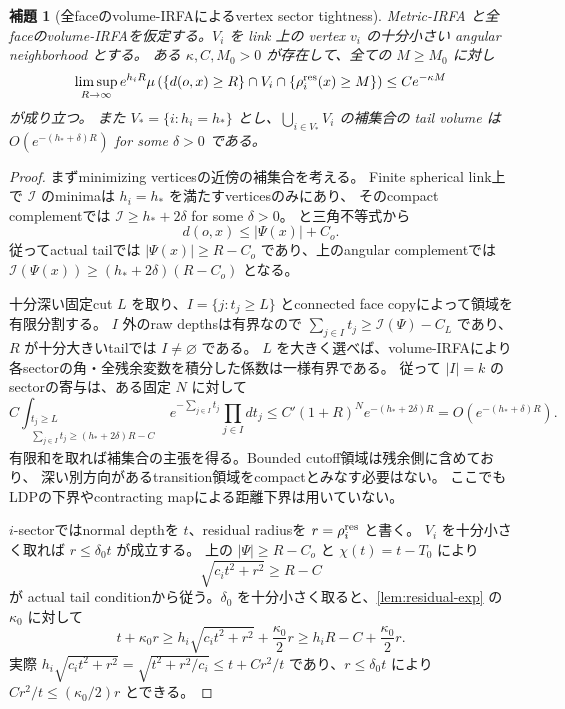 \documentclass[11pt,a4paper]{ltjsarticle}
\newcommand{\cI}{\mathcal I}
\theoremstyle{plain}
\newtheorem{lemma}[lemma]{補題}
\theoremstyle{definition}
\theoremstyle{remark}
\begin{document}
\begin{lemma}[全faceのvolume-IRFAによるvertex sector tightness]
\label{lem:vertex-tightness}
Metric-IRFA と全faceのvolume-IRFAを仮定する。$V_i$ を link 上の vertex $v_i$ の十分小さい angular neighborhood とする。
ある $\kappa,C,M_0>0$ が存在して、全ての $M\ge M_0$ に対し
\begin{equation}
\label{eq:vertex-tight}
 \limsup_{R\to\infty} e^{h_iR}
 \mu\left(\{d(o,x)\ge R\}\cap V_i\cap
 \{\rho_i^{\rm res}(x)\ge M\}\right)
 \le C e^{-\kappa M}
\end{equation}
が成り立つ。
また $V_*=\{i:h_i=h_*\}$ とし、$\bigcup_{i\in V_*}V_i$ の補集合の tail volume は
$O(e^{-(h_*+\delta)R})$ for some $\delta>0$ である。
\end{lemma}
\begin{proof}
まずminimizing verticesの近傍の補集合を考える。
Finite spherical link上で $\cI$ のminimaは $h_i=h_*$ を満たすverticesのみにあり、
そのcompact complementでは $\cI\ge h_*+2\delta$ for some $\delta>0$。
 と三角不等式から
\[
 d(o,x)\le |\Psi(x)|+C_o.
\]
従ってactual tailでは $|\Psi(x)|\ge R-C_o$ であり、上のangular complementでは
$\cI(\Psi(x))\ge(h_*+2\delta)(R-C_o)$ となる。

十分深い固定cut $L$ を取り、$I=\{j:t_j\ge L\}$ とconnected face copyによって領域を有限分割する。
$I$ 外のraw depthsは有界なので
$\sum_{j\in I}t_j\ge\cI(\Psi)-C_L$ であり、$R$ が十分大きいtailでは $I\ne\varnothing$ である。
$L$ を大きく選べば、volume-IRFAにより各sectorの角・全残余変数を積分した係数は一様有界である。
従って $|I|=k$ のsectorの寄与は、ある固定 $N$ に対して
\[
 C\int_{\substack{t_j\ge L\\
       \sum_{j\in I}t_j\ge(h_*+2\delta)R-C}}
       e^{-\sum_{j\in I}t_j}\prod_{j\in I}dt_j
 \le C'(1+R)^N e^{-(h_*+2\delta)R}
 =O(e^{-(h_*+\delta)R}).
\]
有限和を取れば補集合の主張を得る。Bounded cutoff領域は残余側に含めており、
深い別方向があるtransition領域をcompactとみなす必要はない。
ここでもLDPの下界やcontracting mapによる距離下界は用いていない。

$i$-sectorではnormal depthを $t$、residual radiusを $r=\rho_i^{\rm res}$ と書く。
$V_i$ を十分小さく取れば $r\le\delta_0t$ が成立する。
上の $|\Psi|\ge R-C_o$ と $\chi(t)=t-T_0$ により
\[
 \sqrt{c_it^2+r^2}\ge R-C
\]
が actual tail conditionから従う。$\delta_0$ を十分小さく取ると、\cref{lem:residual-exp} の $\kappa_0$ に対して
\begin{equation}
\label{eq:normal-residual-linear}
 t+\kappa_0 r
 \ge h_i\sqrt{c_it^2+r^2}+\frac{\kappa_0}{2}r
 \ge h_iR-C+\frac{\kappa_0}{2}r.
\end{equation}
実際
$h_i\sqrt{c_it^2+r^2}=\sqrt{t^2+r^2/c_i}\le t+C r^2/t$ であり、$r\le\delta_0t$ により $Cr^2/t\le(\kappa_0/2)r$ とできる。


\end{proof}
\end{document}
